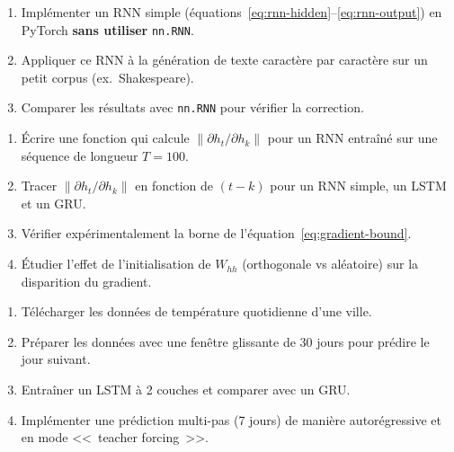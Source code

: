 \begin{exercice}
\begin{enumerate}
  \item Impl\'ementer un RNN simple (\'equations~\ref{eq:rnn-hidden}--\ref{eq:rnn-output})
    en PyTorch \textbf{sans utiliser} \texttt{nn.RNN}.
  \item Appliquer ce RNN \`a la g\'en\'eration de texte caract\`ere par
    caract\`ere sur un petit corpus (ex.\ Shakespeare).
  \item Comparer les r\'esultats avec \texttt{nn.RNN} pour v\'erifier la
    correction.
\end{enumerate}
\end{exercice}

\begin{exercice}
\begin{enumerate}
  \item \'Ecrire une fonction qui calcule
    $\|\partial h_t / \partial h_k\|$ pour un RNN entra\^in\'e sur une
    s\'equence de longueur $T = 100$.
  \item Tracer $\|\partial h_t / \partial h_k\|$ en fonction de $(t - k)$
    pour un RNN simple, un LSTM et un GRU.
  \item V\'erifier exp\'erimentalement la borne de l'\'equation~\ref{eq:gradient-bound}.
  \item \'Etudier l'effet de l'initialisation de $W_{hh}$ (orthogonale vs
    al\'eatoire) sur la disparition du gradient.
\end{enumerate}
\end{exercice}

\begin{exercice}
\begin{enumerate}
  \item T\'el\'echarger les donn\'ees de temp\'erature quotidienne d'une ville.
  \item Pr\'eparer les donn\'ees avec une fen\^etre glissante de 30 jours
    pour pr\'edire le jour suivant.
  \item Entra\^iner un LSTM \`a 2 couches et comparer avec un GRU.
  \item Impl\'ementer une pr\'ediction multi-pas (7 jours) de mani\`ere
    autor\'egressive et en mode <<~teacher forcing~>>.
\end{enumerate}
\end{exercice}

